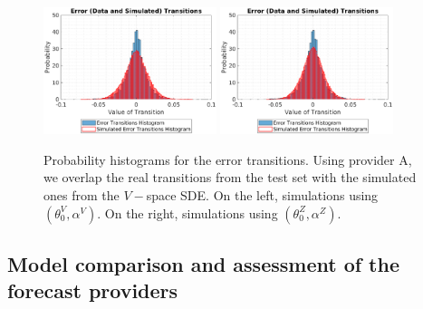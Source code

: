 \documentclass[11pt]{article}
\theoremstyle{definition}
\begin{document}
\begin{figure}[ht!]
\centering
\includegraphics[width=0.45\textwidth]{../../MATLAB_Files/Results/histograms/classic_noDelta/Optimal.eps}
\includegraphics[width=0.45\textwidth]{../../MATLAB_Files/Results/histograms/classic_noDelta/Lamperti_Optimal.eps}
\caption{Probability histograms for the error transitions. Using provider A, we overlap the real transitions from the test set with the simulated ones from the $V-$space SDE. On the left, simulations using $(\theta_0^V,\alpha^V)$. On the right, simulations using $(\theta_0^Z,\alpha^Z)$.}
\label{fig:hists}
\end{figure}

\subsection{Model comparison and assessment of the forecast providers} \label{Model_Comp}
\end{document}
